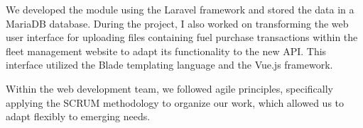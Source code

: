 We developed the module using the Laravel framework and stored the data in a MariaDB database. During the project, I also worked on transforming the web user interface for uploading files containing fuel purchase transactions within the fleet management website to adapt its functionality to the new API. This interface utilized the Blade templating language and the Vue.js framework.

Within the web development team, we followed agile principles, specifically applying the SCRUM methodology to organize our work, which allowed us to adapt flexibly to emerging needs.